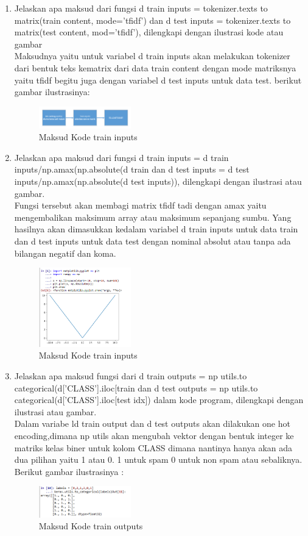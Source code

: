 \begin{enumerate}
\item Jelaskan apa maksud dari fungsi d train inputs = tokenizer.texts to matrix(train content, mode='tfidf') dan d test inputs = tokenizer.texts to matrix(test content, mod='tfidf'), dilengkapi dengan ilustrasi kode atau gambar\\
Maksudnya yaitu untuk variabel d train inputs akan melakukan tokenizer dari bentuk teks kematrix dari data train content dengan mode matriksnya yaitu tfidf begitu juga dengan variabel d test inputs untuk data test. berikut gambar ilustrasinya:
\hfill\break
	\begin{figure}[H]
		\includegraphics[width=4cm]{figures/1174054/7/6.png}
		\centering
		\caption{Maksud Kode train inputs}
	\end{figure}

\item Jelaskan apa maksud dari fungsi d train inputs = d train inputs/np.amax(np.absolute(d train dan d test inputs = d test inputs/np.amax(np.absolute(d test inputs)), dilengkapi dengan ilustrasi atau gambar.\\
Fungsi tersebut akan membagi matrix tfidf tadi dengan amax yaitu mengembalikan maksimum array atau maksimum sepanjang sumbu. Yang hasilnya akan dimasukkan kedalam variabel d train inputs untuk data train dan d test inputs untuk data test dengan nominal absolut atau tanpa ada bilangan negatif dan koma.
\hfill\break
	\begin{figure}[H]
		\includegraphics[width=4cm]{figures/1174054/7/7.png}
		\centering
		\caption{Maksud Kode train inputs}
	\end{figure}

\item Jelaskan apa maksud fungsi dari d train outputs = np utils.to categorical(d[’CLASS’].iloc[train dan d test outputs = np utils.to categorical(d[’CLASS’].iloc[test idx]) dalam kode program, dilengkapi dengan ilustrasi atau gambar.\\
Dalam variabe ld train output dan d test outputs akan dilakukan one hot encoding,dimana np utils akan mengubah vektor dengan bentuk integer ke matriks kelas biner untuk kolom CLASS dimana nantinya hanya akan ada dua pilihan yaitu 1 atau 0. 1 untuk spam 0 untuk non spam atau sebaliknya. Berikut gambar ilustrasinya :
\hfill\break
	\begin{figure}[H]
		\includegraphics[width=4cm]{figures/1174054/7/8.png}
		\centering
		\caption{Maksud Kode train outputs}
	\end{figure}


\end{enumerate}
